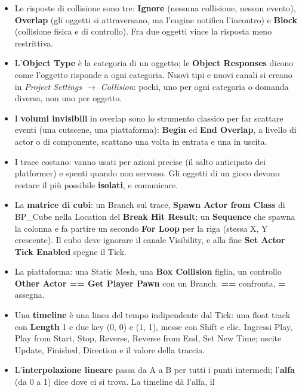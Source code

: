 \begin{itemize}
  \item Le risposte di collisione sono tre: \textbf{Ignore} (nessuna collisione,
        nessun evento), \textbf{Overlap} (gli oggetti si attraversano, ma l'engine
        notifica l'incontro) e \textbf{Block} (collisione fisica e di controllo). Fra due
        oggetti vince la risposta meno restrittiva.
  \item L'\textbf{Object Type} è la categoria di un oggetto; le \textbf{Object Responses}
        dicono come l'oggetto risponde a ogni categoria. Nuovi tipi e nuovi canali si
        creano in \emph{Project Settings $\rightarrow$ Collision}: pochi, uno per ogni
        categoria o domanda diversa, non uno per oggetto.
  \item I \textbf{volumi invisibili} in overlap sono lo strumento classico per far
        scattare eventi (una cutscene, una piattaforma): \textbf{Begin} ed \textbf{End
        Overlap}, a livello di actor o di componente, scattano una volta in entrata e
        una in uscita.
  \item I trace costano: vanno usati per azioni precise (il salto anticipato dei
        platformer) e spenti quando non servono. Gli oggetti di un gioco devono
        restare il più possibile \textbf{isolati}, e comunicare.
  \item La \textbf{matrice di cubi}: un Branch sul trace, \textbf{Spawn Actor from Class}
        di BP\_Cube nella Location del \textbf{Break Hit Result}; un \textbf{Sequence}
        che spawna la colonna e fa partire un secondo \textbf{For Loop} per la riga
        (stessa X, Y crescente). Il cubo deve ignorare il canale Visibility, e alla fine
        \textbf{Set Actor Tick Enabled} spegne il Tick.
  \item La piattaforma: una Static Mesh, una \textbf{Box Collision} figlia, un controllo
        \textbf{Other Actor == Get Player Pawn} con un Branch. \textbf{==} confronta,
        \textbf{=} assegna.
  \item Una \textbf{timeline} è una linea del tempo indipendente dal Tick: una float
        track con \textbf{Length} 1 e due key (0, 0) e (1, 1), messe con Shift e clic.
        Ingressi Play, Play from Start, Stop, Reverse, Reverse from End, Set New Time;
        uscite Update, Finished, Direction e il valore della traccia.
  \item L'\textbf{interpolazione lineare} passa da A a B per tutti i punti intermedi;
        l'\textbf{alfa} (da 0 a 1) dice dove ci si trova. La timeline dà l'alfa, il

\end{itemize}
